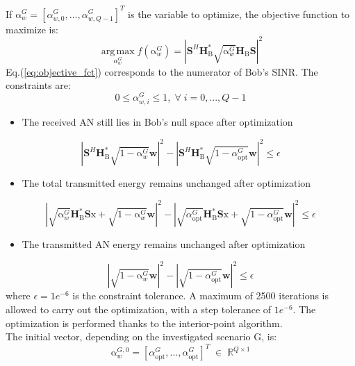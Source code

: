\documentclass[12pt, draftclsnofoot, onecolumn]{IEEEtran}
\newcommand{\module}[1]{\left|#1\right|}
\newcommand{\HB}{\textbf{H}_{\text{B}}}
\newcommand{\spread}{\textbf{S}}
\newcommand{\w}{\textbf{w}}
\newcommand{\mat}[1]{\boldsymbol{\mathrm{#1}}}
\begin{document}
If $\mat{\alpha}_w^G = [\alpha_{w,0}^G,...,\alpha_{w,Q-1}^G]^T$ is the variable to optimize, the objective function to maximize is:
\begin{equation}
	\operatorname*{arg\,max}_{\alpha_w^G}  f(\mat{\alpha}_w^G) = \left| \spread^H \HB^* \sqrt{\mat{\alpha}_w^G} \HB \spread \right|^2
	\label{eq:objective_fct}
\end{equation}
Eq.(\ref{eq:objective_fct}) corresponds to the numerator of Bob's SINR. The constraints are:
\begin{equation}
0 \leq \alpha_{w,i} ^G\leq 1 , \; \forall \; i = 0,...,Q-1  \label{eq:constraint1}
\end{equation}
\begin{itemize}
	\item The received AN still lies in Bob's null space after optimization
\end{itemize}
\begin{equation}
\left| \spread^H \HB^* \sqrt{\mat{1}- \mat{\alpha}_w^G} \w  \right|^2 -  \left| \spread^H \HB^* \sqrt{\mat{1}- \alpha_{\text{opt}}^G} \w  \right|^2 \leq \epsilon \label{eq:constraint2}
\end{equation}
\begin{itemize}
	\item The total transmitted energy remains unchanged after optimization
\end{itemize}
\begin{equation}
\module{\sqrt{\mat{\alpha}_w^G} \HB^* \spread \mat{x} + \sqrt{\mat{1}-\mat{\alpha}_w^G}\w }^2   - \module{\sqrt{\alpha_{\text{opt}}^G}  \HB^* \spread \mat{x} + \sqrt{1-\alpha_{\text{opt}}^G} \w }^2 \leq \epsilon \label{eq:constraint3}
\end{equation}
\begin{itemize}
	\item The transmitted AN energy remains unchanged after optimization
\end{itemize}
\begin{equation}
	\module{\sqrt{\mat{1}- \mat{\alpha}_w^G}\w}^2 - \module{\sqrt{\mat{1}- \alpha_{\text{opt}}^G}\w}^2 \leq \epsilon \label{eq:constraint4}
\end{equation}
where $\epsilon = 1e^{-6}$ is the constraint tolerance. A maximum of 2500 iterations is allowed to carry out the optimization, with a step tolerance of $1e^{-6}$. The optimization is performed thanks to the interior-point algorithm. \\
The initial vector, depending on the investigated scenario $\mat{G}$, is:
\begin{equation}
	\mat{\alpha}_w^{G,0} =\left[\alpha_{\text{opt}}^G , ... ,\alpha_{\text{opt}}^G \right]^T  \; \in \; \mathbb{R}^{Q\times 1}
\end{equation}
\end{document}
